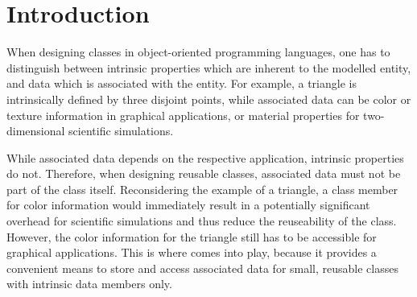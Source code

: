 
\chapter*{Introduction}    \label{intro}



When designing classes in object-oriented programming languages,
one has to distinguish between intrinsic properties which are inherent to the modelled entity,
and data which is associated with the entity. For example, a triangle is intrinsically defined
by three disjoint points, while associated data can be color or texture information in graphical applications, or material properties for two-dimensional scientific simulations.

While associated data depends on the respective application, intrinsic properties do not.
Therefore, when designing reusable classes, associated data must not be part of the class itself.
Reconsidering the example of a triangle, a class member for color information would immediately result in
a potentially significant overhead for scientific simulations and thus reduce the reuseability of the class.
However, the color information for the triangle still has to be accessible for graphical applications. This is where
{\ViennaData} comes into play, because it provides a convenient means to store and access associated data
for small, reusable classes with intrinsic data members only.

